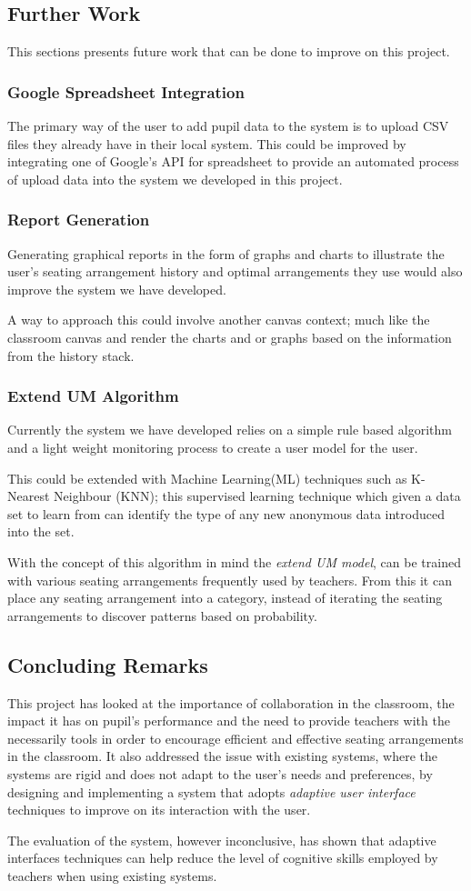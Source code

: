 \subsection{Further Work}
This sections presents future work that can be done to improve on this project.
\subsubsection{Google Spreadsheet Integration}
The primary way of the user to add pupil data to the system is to upload CSV files they already have in their local system. This could be improved by integrating one of Google's API for spreadsheet to provide an automated process of upload data into the system we developed in this project.
\subsubsection{Report Generation}
Generating graphical reports in the form of graphs and charts to illustrate the user's seating arrangement history and optimal arrangements they use would also improve the system we have developed. 

A way to approach this could involve another canvas context; much like the classroom canvas and render the charts and or graphs based on the information from the history stack.
\subsubsection{Extend UM Algorithm}
Currently the system we have developed relies on a simple rule based algorithm and a light weight monitoring process to create a user model for the user. 

This could be extended with Machine Learning(ML) techniques such as K-Nearest Neighbour (KNN); this supervised learning technique which given a data set to learn from can identify the type of any new anonymous data introduced into the set. 

With the concept of this algorithm in mind the \emph{extend UM model}, can be trained with various seating arrangements frequently used by teachers. From this it can place any seating arrangement into a category, instead of iterating the seating arrangements to discover patterns based on probability.  
 
\subsection{Concluding Remarks} 
This project has looked at the importance of collaboration in the classroom, the impact it has on pupil's performance and the need to provide teachers with the necessarily tools in order to encourage efficient and effective seating arrangements in the classroom. It also addressed the issue with existing systems, where the systems are rigid and does not adapt to the user's needs and preferences, by designing and implementing a system that adopts \emph{adaptive user interface} techniques to improve on its interaction with the user.

The evaluation of the system, however inconclusive, has shown that adaptive interfaces techniques can help reduce the level of cognitive skills employed by teachers when using existing systems. 